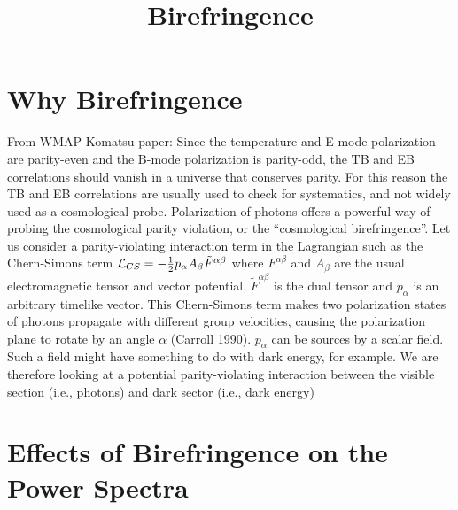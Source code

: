 \documentclass[a4paper, 11pt]{article}
\begin{document}
\title{Birefringence}
\maketitle

\section{Why Birefringence}

From WMAP Komatsu paper:
Since the temperature and E-mode polarization are
parity-even and the B-mode polarization is parity-odd, the TB and EB correlations should vanish in a universe that conserves parity. For this reason the TB and EB correlations are usually used to check for systematics, and not widely used as a cosmological probe.
Polarization of photons offers a powerful way of probing the cosmological parity violation, or the “cosmological birefringence”. Let us consider a parity-violating interaction term in the Lagrangian such as the Chern-Simons term ${\cal L}_{CS}= -\frac{1}{2}p_{\alpha}A_{\beta}{\tilde F}^{\alpha \beta}$ where $F^{\alpha \beta}$ and $A_{\beta}$ are the usual electromagnetic tensor and vector potential, ${\tilde F}^{\alpha \beta}$ is the dual tensor and $p_{\alpha}$ is an arbitrary timelike vector. This Chern-Simons term makes two polarization states of photons propagate with different group velocities, causing the polarization plane to rotate by an angle $\alpha$ (Carroll 1990). $p_{\alpha}$ can be sources by a scalar field. Such a field might have something to do with dark energy, for example. We are therefore looking at a potential parity-violating interaction between the visible section (i.e., photons) and dark sector (i.e., dark energy)

\section{Effects of Birefringence on the Power Spectra}
\end{document}
